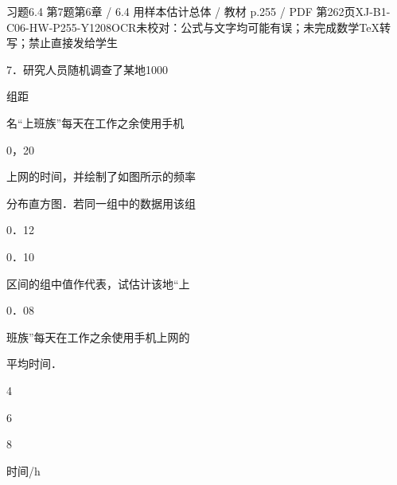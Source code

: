 \begin{bankitem}{习题6.4 第7题}{第6章 / 6.4 用样本估计总体 / 教材 p.255 / PDF 第262页}{XJ-B1-C06-HW-P255-Y1208}{OCR未校对：公式与文字均可能有误；未完成数学TeX转写；禁止直接发给学生}
\begin{ocrdraft}
\par
7．研究人员随机调查了某地1000
\par
组距
\par
名“上班族”每天在工作之余使用手机
\par
0，20
\par
上网的时间，并绘制了如图所示的频率
\par
分布直方图．若同一组中的数据用该组
\par
0．12
\par
0．10
\par
区间的组中值作代表，试估计该地“上
\par
0．08
\par
班族”每天在工作之余使用手机上网的
\par
平均时间．
\par
4
\par
6
\par
8
\par
时间/h
\end{ocrdraft}
\end{bankitem}
